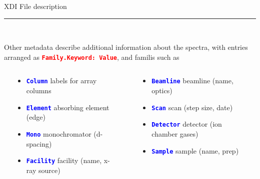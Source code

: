 \documentclass[final]{beamer}
\newcommand{\Color}[2]{{\textcolor{#1}{#2}}}
\newcommand{\BoldRed}[1]{{\Color{Red}{\bf{#1}}}}
\newcommand{\Blue}[1]{{\Color{Blue}{\bf{#1}}}}
\begin{document}
\begin{frame}{}
\begin{columns}[t]
\begin{column}{.42\linewidth}
\begin{block}{\large XDI File description}
         \vspace{3mm}

         \hrule

         \vspace{3mm} {\ }

         \justifying
         Other metadata describe additional information about the spectra, with 
         entries arranged as {\BoldRed{\tt{Family.Keyword:  Value}}}, and
         familis such as

         \begin{columns}[T]
           \begin{column}{0.03\linewidth}
           \end{column}
           \begin{column}{0.46\linewidth}
             \begin{itemize}
             \item {\Blue{\tt{Column}}}   labels for array columns
             \item {\Blue{\tt{Element}}}  absorbing element (edge)
             \item {\Blue{\tt{Mono}}}     monochromator (d-spacing)
             \item {\Blue{\tt{Facility}}} facility  (name, x-ray source)
           \end{itemize}
           \end{column}
           \begin{column}{0.02\linewidth}
           \end{column}
           \begin{column}{0.46\linewidth}
             \begin{itemize}
             \item {\Blue{\tt{Beamline}}} beamline  (name, optics)
             \item {\Blue{\tt{Scan}}}     scan  (step size, date)
             \item {\Blue{\tt{Detector}}} detector (ion chamber gases)
             \item {\Blue{\tt{Sample}}}   sample (name, prep)
           \end{itemize}

           \end{column}
           \begin{column}{0.03\linewidth}
           \end{column}

         \end{columns}
         

\end{block}
\end{column}
\end{columns}
\end{frame}
\end{document}
